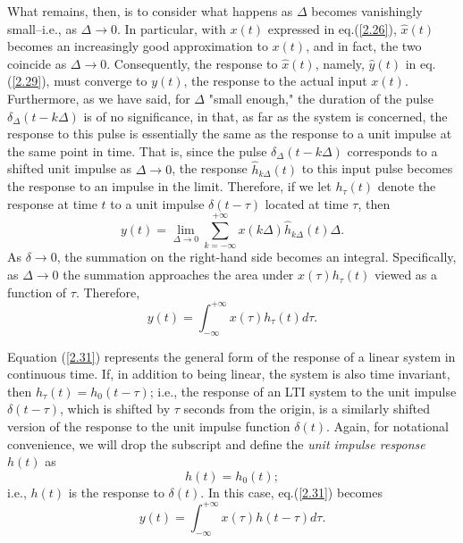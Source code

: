 \documentclass[a4paper,twoside]{book}
\begin{document}
What remains, then, is to consider what happens as $\Delta$ becomes vanishingly small--i.e., as $\Delta\to 0$. In particular, with $x(t)$ expressed in eq.\;(\ref{2.26}), $\hat{x}(t)$ becomes an increasingly good approximation to $x(t)$, and in fact, the two coincide as $\Delta\to 0$. Consequently, the response to $\hat{x}(t)$, namely, $\hat{y}(t)$ in eq.\;(\ref{2.29}), must converge to $y(t)$, the response to the actual input $x(t)$. Furthermore, as we have said, for $\Delta$ "small enough," the duration of the pulse $\delta_\Delta(t-k\Delta)$ is of no significance, in that, as far as the system is concerned, the response to this pulse is essentially the same as the response to a unit impulse at the same point in time. That is, since the pulse $\delta_\Delta(t-k\Delta)$ corresponds to a shifted unit impulse as $\Delta\to 0$, the response $\hat{h}_{k\Delta}(t)$ to this input pulse becomes the response to an impulse in the limit. Therefore, if we let $h_\tau(t)$ denote the response at time $t$ to a unit impulse $\delta(t-\tau)$ located at time $\tau$, then
\begin{equation}
    y(t) = \lim_{\Delta\to0}\sum_{k=-\infty}^{+\infty}x(k\Delta)\hat{h}_{k\Delta}(t)\Delta.
    \label{2.30}
\end{equation}
As $\delta\to 0$, the summation on the right-hand side becomes an integral. Specifically, as $\Delta\to 0$ the summation approaches the area under $x(\tau)h_\tau(t)$ viewed as a function of $\tau$. Therefore,
\begin{equation}
    y(t) = \int_{-\infty}^{+\infty}x(\tau)h_{\tau}(t)d\tau.
    \label{2.31}
\end{equation}

Equation (\ref{2.31}) represents the general form of the response of a linear system in continuous time. If, in addition to being linear, the system is also time invariant, then $h_\tau(t)=h_0(t-\tau)$; i.e., the response of an LTI system to the unit impulse $\delta(t-\tau)$, which is shifted by $\tau$ seconds from the origin, is a similarly shifted version of the response to the unit impulse function $\delta(t)$. Again, for notational convenience, we will drop the subscript and define the \textit{unit impulse response} $h(t)$ as
\begin{equation}
    h(t)=h_0(t);
\end{equation}
i.e., $h(t)$ is the response to $\delta(t)$. In this case, eq.\;(\ref{2.31}) becomes
\begin{equation}
    \boxed{ y(t) = \int_{-\infty}^{+\infty}x(\tau)h(t-\tau)d\tau.}
    \label{2.33}
\end{equation}
\end{document}
